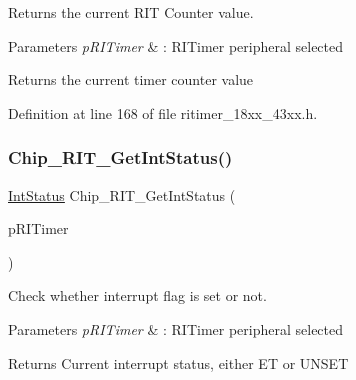 Returns the current R\+IT Counter value. 


\begin{DoxyParams}{Parameters}
{\em p\+R\+I\+Timer} & \+: R\+I\+Timer peripheral selected \\
\hline
\end{DoxyParams}
\begin{DoxyReturn}{Returns}
the current timer counter value 
\end{DoxyReturn}


Definition at line 168 of file ritimer\+\_\+18xx\+\_\+43xx.\+h.

\mbox{\label{group___r_i_t_i_m_e_r__18_x_x__43_x_x_ga07641ae11bdca849c8f3335c32f23a23}} 
\subsubsection{\texorpdfstring{Chip\+\_\+\+R\+I\+T\+\_\+\+Get\+Int\+Status()}{Chip\_RIT\_GetIntStatus()}}
{\footnotesize\ttfamily \hyperlink{group___l_p_c___types___public___types_gab7d263072f745b4f3913fb0afc434c4e}{Int\+Status} Chip\+\_\+\+R\+I\+T\+\_\+\+Get\+Int\+Status (\begin{DoxyParamCaption}\item[{\hyperlink{struct_l_p_c___r_i_t_i_m_e_r___t}{L\+P\+C\+\_\+\+R\+I\+T\+I\+M\+E\+R\+\_\+T} $\ast$}]{p\+R\+I\+Timer }\end{DoxyParamCaption})}



Check whether interrupt flag is set or not. 


\begin{DoxyParams}{Parameters}
{\em p\+R\+I\+Timer} & \+: R\+I\+Timer peripheral selected \\
\hline
\end{DoxyParams}
\begin{DoxyReturn}{Returns}
Current interrupt status, either ET or U\+N\+S\+ET 
\end{DoxyReturn}



